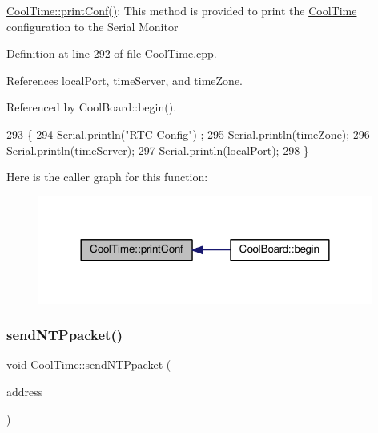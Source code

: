 \hyperlink{classCoolTime_af355e7f9b3898211cd2ff25eab5933b1}{Cool\+Time\+::print\+Conf()}\+: This method is provided to print the \hyperlink{classCoolTime}{Cool\+Time} configuration to the Serial Monitor 

Definition at line 292 of file Cool\+Time.\+cpp.



References local\+Port, time\+Server, and time\+Zone.



Referenced by Cool\+Board\+::begin().


\begin{DoxyCode}
293 \{
294     Serial.println(\textcolor{stringliteral}{"RTC Config"}) ;
295     Serial.println(\hyperlink{classCoolTime_a1916d98810c2a4e9ba72867e8c1b9a99}{timeZone});
296     Serial.println(\hyperlink{classCoolTime_ad2b9858f399108cb440dd1e908916f04}{timeServer});
297     Serial.println(\hyperlink{classCoolTime_a2f777da44d7ba678be8185299e9b49d1}{localPort});
298 \}
\end{DoxyCode}
Here is the caller graph for this function\+:
\nopagebreak
\begin{figure}[H]
\begin{center}
\leavevmode
\includegraphics[width=312pt]{classCoolTime_af355e7f9b3898211cd2ff25eab5933b1_icgraph}
\end{center}
\end{figure}
\mbox{\label{classCoolTime_a236a38d120dc53bc67456d763838c5a1}} 
\subsubsection{\texorpdfstring{send\+N\+T\+Ppacket()}{sendNTPpacket()}}
{\footnotesize\ttfamily void Cool\+Time\+::send\+N\+T\+Ppacket (\begin{DoxyParamCaption}\item[{I\+P\+Address \&}]{address }\end{DoxyParamCaption})}

